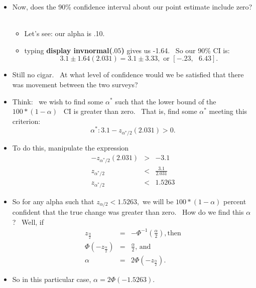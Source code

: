 \documentclass[11pt]{article}
\begin{document}
\begin{itemize}
\item Now, does the 90\% confidence interval about our point estimate
include zero? \ 

\begin{itemize}
\item Let's see: our alpha is .10.

\item typing \textbf{display invnormal(}$.05$\textbf{) }gives us -1.64. \ So
our 90\% CI is:%
\begin{equation*}
3.1\pm 1.64(2.031)=3.1\pm 3.33,\text{ or }[-.23,\text{ }6.43].
\end{equation*}
\end{itemize}

\item Still no cigar. \ At what level of confidence would we be satisfied
that there was movement between the two surveys? \ 

\item Think: \ we wish to find some $\alpha ^{\ast }$ such that the lower
bound of the $100\ast (1-\alpha )$ \ CI is greater than zero. \ That is,
find some $\alpha ^{\ast }$ meeting this criterion:%
\begin{equation*}
\alpha ^{\ast }:3.1-z_{\alpha ^{\ast }/2}(2.031)>0.
\end{equation*}

\item To do this, manipulate the expression%
\begin{eqnarray*}
-z_{\alpha ^{\ast }/2}(2.031) &>&-3.1 \\
z_{\alpha ^{\ast }/2} &<&\frac{3.1}{2.031} \\
z_{\alpha ^{\ast }/2} &<&1.5263
\end{eqnarray*}

\item So for any alpha such that $z_{\alpha /2}<1.5263,$ we will be $100\ast
(1-\alpha )$ percent confident that the true change was greater than zero. \
How do we find this $\alpha $? \ Well, if 
\begin{eqnarray*}
z_{\frac{\alpha }{2}} &=&-\Phi ^{-1}\left( \frac{\alpha }{2}\right) ,\text{
then} \\
\Phi \left( -z_{\frac{\alpha }{2}}\right) &=&\frac{\alpha }{2}\text{, and} \\
\alpha &=&2\Phi \left( -z_{\frac{\alpha }{2}}\right) .
\end{eqnarray*}

\item So in this particular case, $\alpha =2\Phi \left( -1.5263\right) .$ \ 


\end{itemize}
\end{document}
